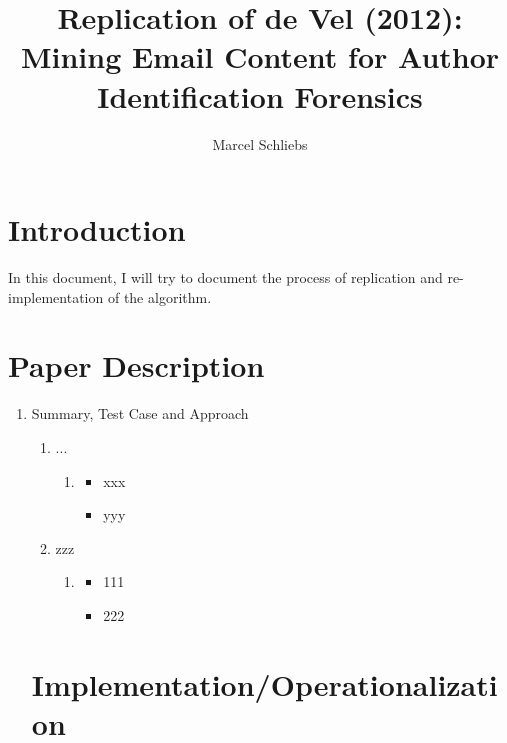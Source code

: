 \documentclass[a4paper,man,natbib]{apa6}
\title{Replication of de Vel (2012): Mining Email Content for Author Identification Forensics}
\author{Marcel Schliebs}
\affiliation{Studienstiftung natur- und ingenieurswissenschaftliches Forschungskolleg}
\begin{document}
\maketitle

\section{Introduction}

In this document, I will try to document the process of replication and re-implementation of the algorithm. 

\section{Paper Description}
\label{sec:Paper Description}

 \begin{enumerate}
	\item Summary, Test Case and Approach
		\begin{enumerate}
		\item ...
		\begin{enumerate}
			\item 
				\begin{itemize}
					\item xxx
					\item yyy
				\end{itemize}
		\end{enumerate}
			\item zzz
	\begin{enumerate}
		\item 
		\begin{itemize}
			\item 111
			\item 222
		\end{itemize}
	\end{enumerate}
\end{enumerate}

\section{Implementation/Operationalization}
\label{sec:Implementation/Operationalization}


\end{enumerate}
\end{document}
